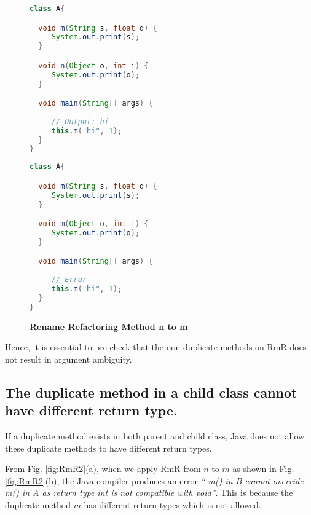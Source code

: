 \begin{figure}[th]
\centering
\begin{minipage}[t]{0.48\linewidth}
\begin{lstlisting}[language=java, basicstyle=\scriptsize\ttfamily,frame=single]
class A{

  void m(String s, float d) {
     System.out.print(s); 
  }

  void n(Object o, int i) {
     System.out.print(o);
  }

  void main(String[] args) {
	
     // Output: hi
     this.m("hi", 1);
  }
}
\end{lstlisting}
\end{minipage}
\hfill
\begin{minipage}[t]{0.48\linewidth}
\begin{lstlisting}[language=java, basicstyle=\scriptsize\ttfamily,frame=single]
class A{

  void m(String s, float d) {
     System.out.print(s); 
  }

  void m(Object o, int i) {
     System.out.print(o);
  }

  void main(String[] args) {
  
     // Error
     this.m("hi", 1);
  }
}

\end{lstlisting}
\end{minipage}
\caption{\textbf{Rename Refactoring Method n to m}}
\label{fig:RmR5}
\end{figure}

Hence, it is essential to pre-check that the non-duplicate methods on RmR does not result in argument ambiguity.

\subsection{The duplicate method in a child class cannot have different return type.}

If a duplicate method exists in both parent and child class, Java does not allow these duplicate methods to have different return types.

From Fig. \ref{fig:RmR2}(a), when we apply RmR from $n$ to $m$ as shown in Fig. \ref{fig:RmR2}(b), the Java compiler produces an error \textsl{`` m() in B cannot override m() in A as return type int is not compatible with void''}. This is because the duplicate method $m$ has different return types which is not allowed. 

